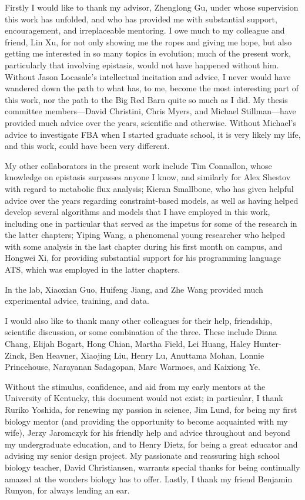 \documentclass[phd,tocprelim]{cornell}
\begin{document}
\begin{acknowledgements}
Firstly I would like to thank my advisor,  Zhenglong Gu, under
whose supervision this work has unfolded, and who has provided me with
substantial support, encouragement, and irreplaceable mentoring. I owe
much to my colleague and friend, Lin Xu, for not only showing me
the ropes and giving me hope, but also getting me interested in so
many topics in evolution; much of the present work, particularly that
involving epistasis, would not have happened without him. Without
Jason Locasale's intellectual incitation and advice, I never would
have wandered down the path to what has, to me, become the most
interesting part of this work, nor the path to the Big Red Barn quite
so much as I did. My thesis committee members---David Christini,
Chris Myers, and Michael Stillman---have provided much advice
over the years, scientific and otherwise. Without Michael's advice to
investigate FBA when I started graduate school, it is very likely my
life, and this work, could have been very different.

My other collaborators in the present work include Tim Connallon,
whose knowledge on epistasis surpasses anyone I know, and similarly
for Alex Shestov with regard to metabolic flux analysis;
Kieran Smallbone, who has given helpful advice over the years 
regarding constraint-based models, as well as having helped develop several  
algorithms and models that I have employed in this work, including one in 
particular that served as the impetus for some of the research in the latter 
chapters; Yiping Wang, a phenomenal young researcher who helped
with some analysis in the last chapter during his first month on
campus, and Hongwei Xi, for providing substantial support for his
programming language ATS, which was employed in the latter chapters.

In the lab, Xiaoxian Guo, Huifeng Jiang, and Zhe Wang
provided much experimental advice, training, and data.

I would also like to thank many other colleagues for their help,
friendship, scientific discussion, or some combination of
the three. These include Diana Chang, Elijah Bogart, 
Hong Chian, Martha Field, Lei Huang,
Haley Hunter-Zinck, Ben Heavner, Xiaojing Liu, Henry Lu, Anuttama Mohan,
Lonnie Princehouse, Narayanan Sadagopan, Marc Warmoes, and Kaixiong Ye.

Without the stimulus, confidence, and aid from my early mentors at the
University of Kentucky, this document would not exist; in particular,
I thank Ruriko Yoshida, for renewing my passion in science,
Jim Lund, for being my first biology mentor (and providing the
opportunity to become acquainted with my wife), Jerzy Jaromczyk
for his friendly help and advice throughout and beyond my
undergraduate education, and to Henry Dietz, for being a great
educator and advising my senior design project.  My passionate and
reassuring high school biology teacher, David Christiansen,
warrants special thanks for being continually amazed at the wonders
biology has to offer. Lastly, I thank my friend Benjamin Runyon,
for always lending an ear.
\end{acknowledgements}
\end{document}
